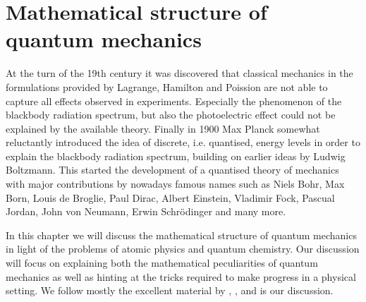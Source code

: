 \chapter{Mathematical structure of quantum mechanics}

At the turn of the 19th century it was discovered
that classical mechanics in the formulations provided
by Lagrange, Hamilton and Poission
are not able to capture all effects observed in experiments.
Especially the phenomenon of the blackbody radiation spectrum,
but also the photoelectric effect could not be explained by the available theory.
Finally in 1900 Max Planck somewhat reluctantly introduced the idea of
discrete, i.e. quantised, energy levels
in order to explain the blackbody radiation spectrum,
building on earlier ideas by Ludwig Boltzmann.
This started the development of a quantised theory of mechanics
with major contributions by nowadays famous
names such as Niels Bohr, Max Born, Louis de Broglie, Paul Dirac, Albert Einstein, Vladimir Fock, Pascual Jordan, John von Neumann, Erwin Schrödinger and many more.

In this chapter we will discuss the mathematical structure
of quantum mechanics in light of the problems of atomic physics
and quantum chemistry.
Our discussion will focus on explaining both the mathematical
peculiarities of quantum mechanics as well as hinting
at the tricks required to make progress in a physical setting.
We follow mostly the excellent material by \citet{Shankar1994},
\citet{Mueller2000}, \citet{Davies2007} and \citet{Helffer2013} is our discussion.




